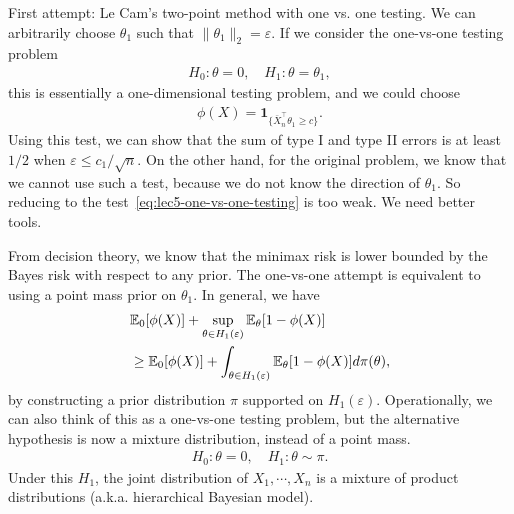 \documentclass[11pt,letterpaper]{article}
\numberwithin{theorem}{lecture}
\numberwithin{proposition}{lecture}
\numberwithin{lemma}{lecture}
\numberwithin{claim}{lecture}
\numberwithin{corollary}{lecture}
\numberwithin{definition}{lecture}
\numberwithin{conjecture}{lecture}
\numberwithin{remark}{lecture}
\numberwithin{example}{lecture}
\numberwithin{equation}{lecture}
\begin{document}
First attempt: Le Cam's two-point method with one vs. one testing. We can arbitrarily choose $\theta_1$ such that $\|\theta_1\|_2 = \varepsilon$. If we consider the one-vs-one testing problem
\begin{align}
  H_0: \theta = 0, \quad H_1: \theta = \theta_1,\label{eq:lec5-one-vs-one-testing}
\end{align}
this is essentially a one-dimensional testing problem, and we could choose
\begin{align*}
  \phi (X) = \bm{1}_{\{\bar{X}_n^\top \theta_1 \geq c\}}.
\end{align*}
Using this test, we can show that the sum of type I and type II errors is at least $1/2$ when $\varepsilon \leq c_1 / \sqrt{n}$. On the other hand, for the original problem, we know that we cannot use such a test, because we do not know the direction of $\theta_1$. So reducing to the test~\eqref{eq:lec5-one-vs-one-testing} is too weak. We need better tools.

From decision theory, we know that the minimax risk is lower bounded by the Bayes risk with respect to any prior. The one-vs-one attempt is equivalent to using a point mass prior on $\theta_1$. In general, we have
\begin{align*}
  &{\mathbb{E}}_0 [\phi (X)] + \sup_{\theta \in H_1 (\varepsilon)} {\mathbb{E}}_\theta [1 - \phi (X)]\\
  &\geq {\mathbb{E}}_0 [\phi (X)] + \int_{\theta \in H_1 (\varepsilon)} {\mathbb{E}}_\theta [1 - \phi (X)] d\pi (\theta),
\end{align*}
by constructing a prior distribution $\pi$ supported on $H_1 (\varepsilon)$. Operationally, we can also think of this as a one-vs-one testing problem, but the alternative hypothesis is now a mixture distribution, instead of a point mass.
\begin{align*}
  H_0: \theta = 0, \quad H_1: \theta \sim \pi.
\end{align*}
Under this $H_1$, the joint distribution of $X_1, \cdots, X_n$ is a mixture of product distributions (a.k.a. hierarchical Bayesian model).
\end{document}
